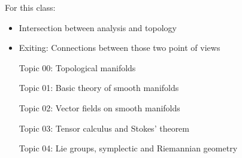 For this class: 
\begin{itemize}
    \item Intersection between analysis and topology
    \item Exiting: Connections between those two point of views 
\end{itemize}
\begin{enumerate}
    \item[Topic 00:] Topological manifolds 
    \item[Topic 01:] Basic theory of smooth manifolds
    \item[Topic 02:] Vector fields on smooth manifolds
    \item[Topic 03:] Tensor calculus and Stokes' theorem 
    \item[Topic 04:] Lie groups, symplectic and Riemannian geometry     
\end{enumerate}

